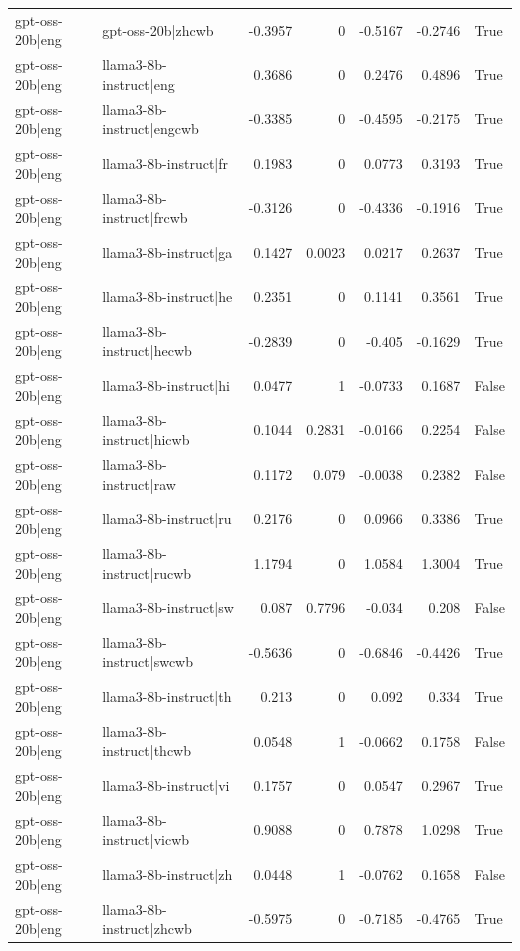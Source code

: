 \begin{table}
\begin{tabular}{l l r r r r l}
gpt-oss-20b|eng & gpt-oss-20b|zhcwb & -0.3957 & 0 & -0.5167 & -0.2746 & True \\
gpt-oss-20b|eng & llama3-8b-instruct|eng & 0.3686 & 0 & 0.2476 & 0.4896 & True \\
gpt-oss-20b|eng & llama3-8b-instruct|engcwb & -0.3385 & 0 & -0.4595 & -0.2175 & True \\
gpt-oss-20b|eng & llama3-8b-instruct|fr & 0.1983 & 0 & 0.0773 & 0.3193 & True \\
gpt-oss-20b|eng & llama3-8b-instruct|frcwb & -0.3126 & 0 & -0.4336 & -0.1916 & True \\
gpt-oss-20b|eng & llama3-8b-instruct|ga & 0.1427 & 0.0023 & 0.0217 & 0.2637 & True \\
gpt-oss-20b|eng & llama3-8b-instruct|he & 0.2351 & 0 & 0.1141 & 0.3561 & True \\
gpt-oss-20b|eng & llama3-8b-instruct|hecwb & -0.2839 & 0 & -0.405 & -0.1629 & True \\
gpt-oss-20b|eng & llama3-8b-instruct|hi & 0.0477 & 1 & -0.0733 & 0.1687 & False \\
gpt-oss-20b|eng & llama3-8b-instruct|hicwb & 0.1044 & 0.2831 & -0.0166 & 0.2254 & False \\
gpt-oss-20b|eng & llama3-8b-instruct|raw & 0.1172 & 0.079 & -0.0038 & 0.2382 & False \\
gpt-oss-20b|eng & llama3-8b-instruct|ru & 0.2176 & 0 & 0.0966 & 0.3386 & True \\
gpt-oss-20b|eng & llama3-8b-instruct|rucwb & 1.1794 & 0 & 1.0584 & 1.3004 & True \\
gpt-oss-20b|eng & llama3-8b-instruct|sw & 0.087 & 0.7796 & -0.034 & 0.208 & False \\
gpt-oss-20b|eng & llama3-8b-instruct|swcwb & -0.5636 & 0 & -0.6846 & -0.4426 & True \\
gpt-oss-20b|eng & llama3-8b-instruct|th & 0.213 & 0 & 0.092 & 0.334 & True \\
gpt-oss-20b|eng & llama3-8b-instruct|thcwb & 0.0548 & 1 & -0.0662 & 0.1758 & False \\
gpt-oss-20b|eng & llama3-8b-instruct|vi & 0.1757 & 0 & 0.0547 & 0.2967 & True \\
gpt-oss-20b|eng & llama3-8b-instruct|vicwb & 0.9088 & 0 & 0.7878 & 1.0298 & True \\
gpt-oss-20b|eng & llama3-8b-instruct|zh & 0.0448 & 1 & -0.0762 & 0.1658 & False \\
gpt-oss-20b|eng & llama3-8b-instruct|zhcwb & -0.5975 & 0 & -0.7185 & -0.4765 & True \\

\end{tabular}
\end{table}
